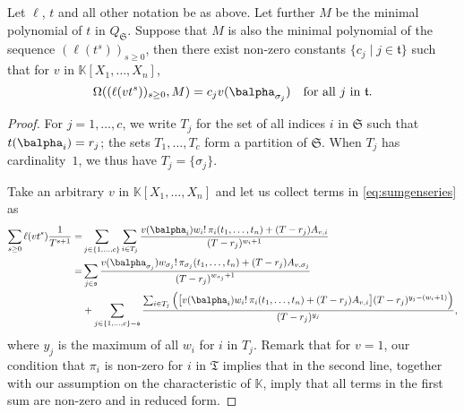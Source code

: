 \documentclass[12pt]{article}
\def\K {\ensuremath{\mathbb{K}}}
\def\K{\mathbb{K}}
\begin{document}
\begin{lemma} \label{lemma:anyv}
	Let $\ell$, $t$ and all other notation be as above. Let further
	$M$ be the minimal polynomial of $t$ in $Q_\mathfrak{S}$. Suppose that 
	$M$ is also the minimal polynomial of the sequence $(\ell(t^s))_{s \ge 0}$,
	then there exist non-zero constants $\{c_j \mid j \in
	\mathfrak{t}\}$  such that for $v$ in
	$\K[X_1,\dots,X_n]$,
	$$\Omega((\ell(v t^s))_{s\ge0},M) = c_{j} v(\balpha_{\sigma_j}) \quad \text{for all $j$ in $\mathfrak{t}$.}$$
\end{lemma}
\begin{proof}
	For $j=1,\dots,c$, we write $T_j$ for the set of all indices $i$ in
	$\mathfrak{S}$ such that $t(\balpha_{i})=r_j$; the sets
	$T_1,\dots,T_c$ form a partition of $\mathfrak{S}$. When $T_j$ has
	cardinality~$1$, we thus have $T_j=\{\sigma_j\}$.
	
	Take an arbitrary $v$ in $\K[X_1,\dots,X_n]$ and let us
	collect terms in \cref{eq:sumgenseries} as
	\begin{align*}
	\sum_{s \ge 0} \ell(v t^s)\frac{1}{T^{s+1}} =&
	\sum_{j \in \{1,\dots,c\}}
	\sum_{i \in T_j} \frac{
		v(\balpha_{i})   w_{i}!\, \pi_{i}(t_1,\dots,t_n)
		+ (T-r_{j} )A_{v,i}}
	{(T-r_{j} )^{w_{i}+1}}\\
	=&
	\sum_{j \in \mathfrak{s}}
	\frac{
		v(\balpha_{\sigma_{j}})  w_{\sigma_j}!\, \pi_{\sigma_j}(t_1,\dots,t_n)
		+ (T-r_{j}  )A_{v,\sigma_j} }
	{(T-r_{j} )^{w_{\sigma_j}+1}}\\
	&+
	\sum_{j \in \{1,\dots,c\}-\mathfrak{s}}
	\frac{   \sum_{i \in T_j} \Big( \big[
		v(\balpha_{i})   w_{i}!\, \pi_{i}(t_1,\dots,t_n)
		 + (T-r_{j}  )A_{v,i} \big ]
		(T-r_{j} )^{y_j-(w_i+1)}\Big)}
	{(T-r_{j} )^{y_j}},
	\end{align*}
	where $y_j$ is the maximum of all $w_i$ for $i$ in $T_j$.  Remark that
	for $v=1$, our condition that $\pi_i$ is non-zero for $i$ in
	$\mathfrak{T}$ implies that in the second line, together with our
	assumption on the characteristic of $\K$, imply that all terms in the
	first sum are non-zero and in reduced form.  
	

\end{proof}
\end{document}
